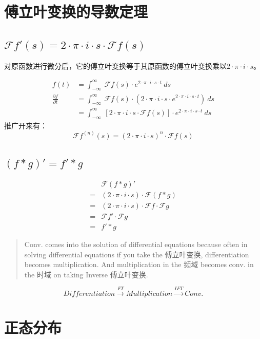 \section{傅立叶变换的导数定理}
\subsection{$\mathcal{F}f'(s)=2\cdot \pi\cdot i\cdot s\cdot \mathcal{F}f(s)$}
对原函数进行微分后，它的傅立叶变换等于其原函数的傅立叶变换乘以$2\cdot \pi\cdot i\cdot s$。

\begin{align*}
	f(t)                          & =\int_{-\infty}^{\infty}\ \mathcal{F}f(s)\cdot e^{2\cdot \pi\cdot i\cdot s\cdot t}\ ds                                 \\
	\frac{\partial f}{\partial t} & =\int_{-\infty}^{\infty}\ \mathcal{F}f(s)\cdot(2\cdot \pi\cdot i\cdot s\cdot e^{2\cdot \pi\cdot i\cdot s\cdot t})\ ds  \\
	                              & =\int_{-\infty}^{\infty}\ [2\cdot \pi\cdot i\cdot s\cdot \mathcal{F}f(s)]\cdot e^{2\cdot \pi\cdot i\cdot s\cdot t}\ ds
\end{align*}
推广开来有：
$$
	\mathcal{F}f^{(n)}(s)=(2\cdot \pi\cdot i\cdot s)^n\cdot \mathcal{F}f(s)
$$
\subsection{$(f*g)'=f'*g$}
\begin{align*}
	  & \mathcal{F}(f*g)'                                              \\
	= & (2\cdot \pi\cdot i\cdot s)\cdot \mathcal{F}(f*g)               \\
	= & (2\cdot \pi\cdot i\cdot s)\cdot \mathcal{F}f\cdot \mathcal{F}g \\
	= & \mathcal{F}f'\cdot \mathcal{F}g                                \\
	= & f'*g
\end{align*}
\begin{quote}
	Conv. comes into the solution of differential equations because often in solving differential equations if you take the 傅立叶变换, differentiation becomes multiplication. And multiplication in the 频域 becomes conv. in the 时域 on taking Inverse 傅立叶变换.
\end{quote}
$$
	Differentiation\stackrel{FT}\longrightarrow Multiplication\stackrel{IFT}\longrightarrow Conv.
$$
\section{正态分布}

